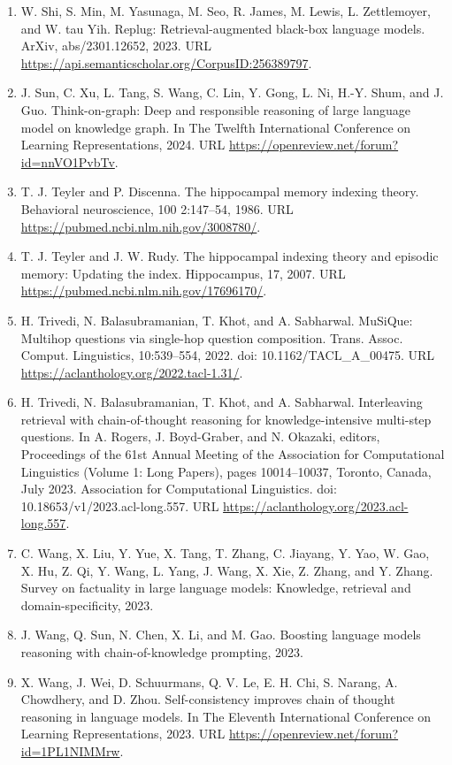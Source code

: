 \documentclass[11pt,UTF8,fontset=fandol]{ctexart}
\begin{document}
\begin{enumerate}[leftmargin=2em]
\item W. Shi, S. Min, M. Yasunaga, M. Seo, R. James, M. Lewis, L. Zettlemoyer, and W. tau Yih. Replug: Retrieval-augmented black-box language models. ArXiv, abs/2301.12652, 2023. URL \url{https://api.semanticscholar.org/CorpusID:256389797}.
\item J. Sun, C. Xu, L. Tang, S. Wang, C. Lin, Y. Gong, L. Ni, H.-Y. Shum, and J. Guo. Think-on-graph: Deep and responsible reasoning of large language model on knowledge graph. In The Twelfth International Conference on Learning Representations, 2024. URL \url{https://openreview.net/forum?id=nnVO1PvbTv}.
\item T. J. Teyler and P. Discenna. The hippocampal memory indexing theory. Behavioral neuroscience, 100 2:147--54, 1986. URL \url{https://pubmed.ncbi.nlm.nih.gov/3008780/}.
\item T. J. Teyler and J. W. Rudy. The hippocampal indexing theory and episodic memory: Updating the index. Hippocampus, 17, 2007. URL \url{https://pubmed.ncbi.nlm.nih.gov/17696170/}.
\item H. Trivedi, N. Balasubramanian, T. Khot, and A. Sabharwal. MuSiQue: Multihop questions via single-hop question composition. Trans. Assoc. Comput. Linguistics, 10:539--554, 2022. doi: 10.1162/TACL\_A\_00475. URL \url{https://aclanthology.org/2022.tacl-1.31/}.
\item H. Trivedi, N. Balasubramanian, T. Khot, and A. Sabharwal. Interleaving retrieval with chain-of-thought reasoning for knowledge-intensive multi-step questions. In A. Rogers, J. Boyd-Graber, and N. Okazaki, editors, Proceedings of the 61st Annual Meeting of the Association for Computational Linguistics (Volume 1: Long Papers), pages 10014--10037, Toronto, Canada, July 2023. Association for Computational Linguistics. doi: 10.18653/v1/2023.acl-long.557. URL \url{https://aclanthology.org/2023.acl-long.557}.
\item C. Wang, X. Liu, Y. Yue, X. Tang, T. Zhang, C. Jiayang, Y. Yao, W. Gao, X. Hu, Z. Qi, Y. Wang, L. Yang, J. Wang, X. Xie, Z. Zhang, and Y. Zhang. Survey on factuality in large language models: Knowledge, retrieval and domain-specificity, 2023.
\item J. Wang, Q. Sun, N. Chen, X. Li, and M. Gao. Boosting language models reasoning with chain-of-knowledge prompting, 2023.
\item X. Wang, J. Wei, D. Schuurmans, Q. V. Le, E. H. Chi, S. Narang, A. Chowdhery, and D. Zhou. Self-consistency improves chain of thought reasoning in language models. In The Eleventh International Conference on Learning Representations, 2023. URL \url{https://openreview.net/forum?id=1PL1NIMMrw}.

\end{enumerate}
\end{document}
